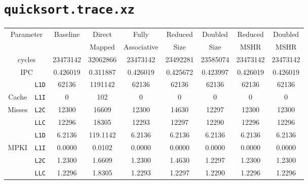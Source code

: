 \documentclass[11pt, swedish, openany]{book}
\begin{document}
\section{\texttt{quicksort.trace.xz}}
\begin{table}[H]
    \begin{tabular}{||c|c||c||c|c||c|c||c|c||}
        \hline
        \multicolumn{2}{||c||}{\multirow{2}{*}{Parameter}} & \multirow{2}{*}{Baseline} & Direct   & Fully       & Reduced  & Doubled  & Reduced  & Doubled  \\
        \multicolumn{2}{||c||}{}                           &                           & Mapped   & Associative & Size     & Size     & MSHR     & MSHR     \\
        \hline
        \multicolumn{2}{||c||}{cycles}                     & 23473142                  & 32062866 & 23473142    & 23492281 & 23585074 & 23473142 & 23473142 \\
        \multicolumn{2}{||c||}{IPC}                        & 0.426019                  & 0.311887 & 0.426019    & 0.425672 & 0.423997 & 0.426019 & 0.426019 \\
        \hline
                                            & \texttt{L1D} & 62136                     & 1191142  & 62136       & 62136    & 62136    & 62136    & 62136    \\
        Cache                               & \texttt{L1I} & 0                         & 102      & 0           & 0        & 0        & 0        & 0        \\
        Misses                              & \texttt{L2C} & 12300                     & 16609    & 12300       & 14630    & 12297    & 12300    & 12300    \\
                                            & \texttt{LLC} & 12296                     & 18305    & 12293       & 12297    & 12290    & 12296    & 12296    \\
        \hline
                                            & \texttt{L1D} & 6.2136                    & 119.1142 & 6.2136      & 6.2136   & 6.2136   & 6.2136   & 6.2136   \\
        \multirow{2}{*}{MPKI}               & \texttt{L1I} & 0.0000                    & 0.0102   & 0.0000      & 0.0000   & 0.0000   & 0.0000   & 0.0000   \\
                                            & \texttt{L2C} & 1.2300                    & 1.6609   & 1.2300      & 1.4630   & 1.2297   & 1.2300   & 1.2300   \\
                                            & \texttt{LLC} & 1.2296                    & 1.8305   & 1.2293      & 1.2297   & 1.2290   & 1.2296   & 1.2296   \\

\end{tabular}
\end{table}
\end{document}
